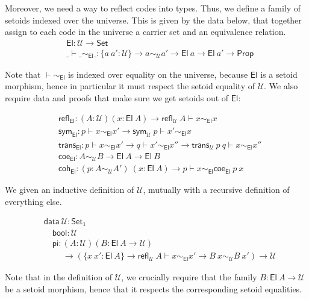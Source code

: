 \documentclass{easychair}
\newcommand{\setoidU}{\mathcal{U}}
\newcommand{\Set}{\textsf{Set}}
\newcommand{\Prop}{\textsf{Prop}}
\newcommand{\El}{\textsf{El}}
\newcommand{\reflu}{\textsf{refl}_\setoidU}
\newcommand{\symu}{\textsf{sym}_\setoidU}
\newcommand{\transu}{\textsf{trans}_\setoidU}
\newcommand{\coeel}{\textsf{coe}_\El}
\newcommand{\cohel}{\textsf{coh}_\El}
\newcommand{\equ}[2]{#1 \sim_\setoidU #2}
\newcommand{\eqel}[3]{#1 \vdash #2 \sim_\El #3}
\begin{document}
Moreover, we need a way to reflect codes into types. Thus, we define a family of
setoids indexed over the universe. This is given by the data below, that
together assign to each code in the universe a carrier set and an equivalence
relation.
%
\begin{align*}
  & \El : \setoidU \to \Set \\
  & \_\vdash\_\sim_\El\_ : \{a\ a' : \setoidU\} \to a \sim_\setoidU a' \to \El\ a \to \El\ a' \to \Prop
\end{align*}

Note that $\eqel{}{}{}$ is indexed over equality on the universe, because $\El$
is a setoid morphism, hence in particular it must respect the setoid equality of
$\setoidU$.
%
We also require data and proofs that make sure we get setoids out of $\El$:

\begin{align*}
  & \textsf{refl}_\El : (A : \setoidU) (x : \El\ A) \to \eqel{\reflu\ A}{x}{x} \\
  & \textsf{sym}_\El : \eqel{p}{x}{x'} \to \eqel{\symu\ p}{x'}{x} \\
  & \textsf{trans}_\El : \eqel{p}{x}{x'} \to \eqel{q}{x'}{x''} \to \eqel{\transu\ p\ q}{x}{x''} \\
  & \coeel : \equ{A}{B} \to \El\ A \to \El\ B \\
  & \cohel : (p : \equ{A}{A'}) \ (x : \El\ A) \to \eqel{p}{x}{\coeel\ p\ x}
\end{align*}


We given an inductive definition of $\setoidU$, mutually with a recursive
definition of everything else.

\begin{align*}
  & \textsf{data}\ \setoidU : \Set_1 \\
  & \quad \textsf{bool} : \setoidU \\
  & \quad \textsf{pi}
  :  (A : \setoidU) (B : \El\ A \to \setoidU)\\
  & \ \qquad \to (\{x\ x' : \El\ A\} \to \textsf{refl}_\setoidU\ A \vdash x \sim_\El x' \to B\ x \sim_\setoidU B\ x')
  \to \setoidU
\end{align*}

Note that in the definition of $\setoidU$, we crucially require that the family
$B : \El\ A \to \setoidU$ be a setoid morphism, hence that it respects the
corresponding setoid equalities.
\end{document}
